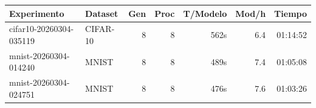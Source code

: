 \begin{tabular}{llrrrrr}
\toprule
Experimento & Dataset & Gen & Proc & T/Modelo & Mod/h & Tiempo \\
\midrule
cifar10-20260304-035119 & CIFAR-10 & 8 & 8 & 562s & 6.4 & 01:14:52 \\
mnist-20260304-014240 & MNIST & 8 & 8 & 489s & 7.4 & 01:05:08 \\
mnist-20260304-024751 & MNIST & 8 & 8 & 476s & 7.6 & 01:03:26 \\
\bottomrule
\end{tabular}